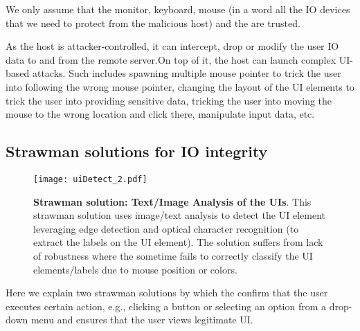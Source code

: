 We only assume that the monitor, keyboard, mouse (in a word all the IO devices that we need to protect from the malicious host) and the \device are trusted.

 As the host is attacker-controlled, it can intercept, drop or modify the user IO data to and from the remote server.On top of it, the host can launch complex UI-based attacks. Such includes spawning multiple mouse pointer to trick the user into following the wrong mouse pointer, changing the layout of the UI elements to trick the user into providing sensitive data, tricking the user into moving the mouse to the wrong location and click there, manipulate input data, etc.

\iffalse
\begin{figure}[t]
\centering
\texttt{[image: screenPartition.pdf]}
\caption{\textbf{\device's pointer tracking, pointer \& UI overlay, and security properties.} Our proposed method provides two layers of protection for IO to the user. 1. In all the parts of the screen, the \device provide pointer integrity (the gray part). 2. The green part of the screen where the \device overlays on the HDMI stream where the \device provide integrity and privacy (privacy is dependent on the application requirements) for the IO.}
\label{fig:screenPartition}
\centering
\end{figure}
\fi


\subsection{Strawman solutions for IO integrity}
\label{sec:approach:strawman}

\begin{figure}[t]
\centering
\texttt{[image: uiDetect\_2.pdf]}
\caption{\textbf{Strawman solution: Text/Image Analysis of the UIs}. This strawman solution uses image/text analysis to detect the UI element leveraging edge detection and optical character recognition (to extract the labels on the UI element). The solution suffers from lack of robustness where the \device sometime fails to correctly classify the UI elements/labels due to mouse position or colors.}
\label{fig:uiDetect}
\centering
\end{figure}

Here we explain two strawman solutions by which the \device confirm that the user executes certain action, e.g., clicking a button  or selecting an option from a drop-down menu and ensures that the user views legitimate UI.


